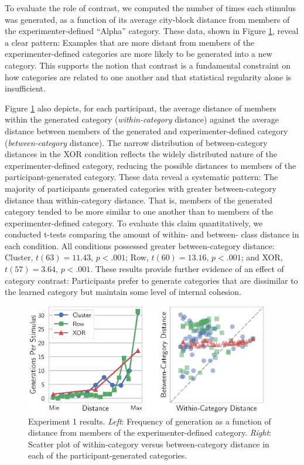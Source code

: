\documentclass[pdflatex,sn-apa]{sn-jnl}%
\theoremstyle{thmstyleone}%
\theoremstyle{thmstyletwo}%
\theoremstyle{thmstylethree}%
\begin{document}
To evaluate the role of contrast, we computed the number of times each stimulus
was generated, as a function of its average city-block distance from members of
the experimenter-defined ``Alpha'' category. These data, shown in Figure
\ref{fig:e1-distanceplots}, reveal a clear pattern: Examples that are more
distant from members of the experimenter-defined categories are more likely to
be generated into a new category. This supports the notion that contrast is a
fundamental constraint on how categories are related to one another and that
statistical regularity alone is insufficient.


Figure \ref{fig:e1-distanceplots} also depicts, for each participant, the
average distance of members within the generated category ({\em within-category}
distance) against the average distance between members of the generated and
experimenter-defined category ({\em between-category} distance). The narrow
distribution of between-category distances in the XOR condition reflects the
widely distributed nature of the experimenter-defined category, reducing the
possible distances to members of the participant-generated category. These data
reveal a systematic pattern: The majority of participants generated categories
with greater between-category distance than within-category distance. That is,
members of the generated category tended to be more similar to one another than
to members of the experimenter-defined category. To evaluate this claim
quantitatively, we conducted t-tests comparing the amount of within- and
between- class distance in each condition. All conditions possessed greater
between-category distance: Cluster, $t(63) = 11.43$, $p < .001$; Row, $t(60) =
13.16$, $p < .001$; and XOR, $t(57) = 3.64$, $p < .001$. These results provide
further evidence of an effect of category contrast: Participants prefer to
generate categories that are dissimilar to the learned category but maintain
some level of internal cohesion.

\begin{figure}
    \begin{center} \includegraphics[width=0.95\textwidth]{figs/e1-distanceplots.eps}
    \caption{Experiment 1 results. {\em Left}: Frequency of generation as a
function of distance from members of the experimenter-defined category. {\em
Right}: Scatter plot of within-category versus between-category distance in each
of the participant-generated categories.}
    \label{fig:e1-distanceplots}
    \end{center}
\end{figure}
\end{document}
